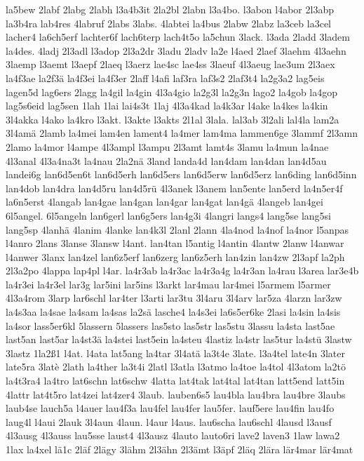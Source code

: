 {la5bew
2labf
2labg
2labh
l3a4b3it
2la2bl
2labn
l3a4bo.
l3abon
l4abor
2l3abp
la3b4ra
lab4res
4labruf
2labs
3labs.
4labtei
la4bus
2labw
2labz
la3ceb
la3cel
lacher4
la6ch5erf
lachter6f
lach6terp
lach4t5o
la5chun
3lack.
l3ada
2ladd
3ladem
la4des.
4ladj
2l3adl
l3adop
2l3a2dr
3ladu
2ladv
la2e
l4aed
2laef
3laehm
4l3aehn
3laemp
l3aemt
l3aepf
2laeq
l3aerz
lae4sc
lae4ss
3laeuf
4l3aeug
lae3um
2l3aex
la4f3ae
la2f3ä
la4f3ei
la4f3er
2laff
l4afi
laf3ra
laf3s2
2laf3t4
la2g3a2
lag5eis
lagen5d
lag6ers
2lagg
la4gil
la4gin
4l3a4gio
la2g3l
la2g3n
lago2
la4gob
la4gop
lag5s6eid
lag5sen
1lah
1lai
lai4s3t
1laj
4l3a4kad
la4k3ar
l4ake
la4kes
la4kin
3l4akka
l4ako
la4kro
l3akt.
l3akte
l3akts
2l1al
3lala.
lal3ab
3l2ali
lal4la
lam2a
3l4amä
2lamb
la4mei
lam4en
lament4
la4mer
lam4ma
lammen6ge
3lammf
2l3amn
2lamo
la4mor
l4ampe
4l3ampl
l3ampu
2l3amt
lamt4s
3lamu
la4mun
la4nae
4l3anal
4l3a4na3t
la4nau
2la2nä
3land
landa4d
lan4dam
lan4dan
lan4d5au
landei6g
lan6d5en6t
lan6d5erh
lan6d5ers
lan6d5erw
lan6d5erz
lan6ding
lan6d5inn
lan4dob
lan4dra
lan4d5ru
lan4d5rü
4l3anek
l3anem
lan5ente
lan5erd
la4n5er4f
la6n5erst
4langab
lan4gae
lan4gan
lan4gar
lan4gat
lan4gä
4langeb
lan4gei
6l5angel.
6l5angeln
lan6gerl
lan6g5ers
lan4g3i
4langri
langs4
lang5se
lang5si
lang5sp
4lanhä
4lanim
4lanke
lan4k3l
2lanl
2lann
4la4nod
la4nof
la4nor
l5anpas
l4anro
2lans
3lanse
3lansw
l4ant.
lan4tan
l5antig
l4antin
4lantw
2lanw
l4anwar
l4anwer
3lanx
lan4zel
lan6z5erf
lan6zerg
lan6z5erh
lan4zin
lan4zw
2l3apf
la2ph
2l3a2po
4lappa
lap4pl
l4ar.
la4r3ab
la4r3ac
la4r3a4g
la4r3an
la4rau
l3area
lar3e4b
la4r3ei
la4r3el
lar3g
lar5ini
lar5ins
l3arkt
lar4mau
lar4mei
l5armem
l5armer
4l3a4rom
3larp
lar6schl
lar4ter
l3arti
lar3tu
3l4aru
3l4arv
lar5za
4larzn
lar3zw
la4s3aa
la4sae
la4sam
la4sas
la2sä
lasche4
la4s3ei
la6s5er6ke
2lasi
la4sin
la4sis
la4sor
lass5er6kl
5lassern
5lassers
las5sto
las5str
las5stu
3lassu
la4sta
last5ae
last5an
last5ar
la4st3ä
la4stei
last5ein
la4steu
4lastiz
la4str
las5tur
la4stü
3lastw
3lastz
1la2ß1
l4at.
l4ata
lat5ang
la4tar
3l4atä
la3t4e
3late.
l3a4tel
late4n
3later
late5ra
3latè
2lath
la4ther
la3t4i
2latl
l3atla
l3atmo
la4toe
la4tol
4l3atom
la2tö
la4t3ra4
la4tro
lat6schn
lat6schw
4latta
lat4tak
lat4tal
lat4tan
latt5end
latt5in
4lattr
lat4t5ro
lat4zei
lat4zer4
3laub.
lauben6s5
lau4bla
lau4bra
lau4bre
3laubs
laub4se
lauch5a
l4auer
lau4f3a
lau4fel
lau4fer
lau5fer.
lauf5ere
lau4fin
lau4fo
laug4l
l4aui
2lauk
3l4aun
4laun.
l4aur
l4aus.
lau6scha
lau6schl
4lausd
l3ausf
4l3ausg
4l3auss
lau5sse
laust4
4l3ausz
4lauto
lauto6ri
lave2
laven3
1law
lawa2
1lax
la4xel
lä1c
2läf
2lägy
3lähm
2l3ähn
2l3ämt
l3äpf
2läq
2lära
lär4mar
lär4mat
}
